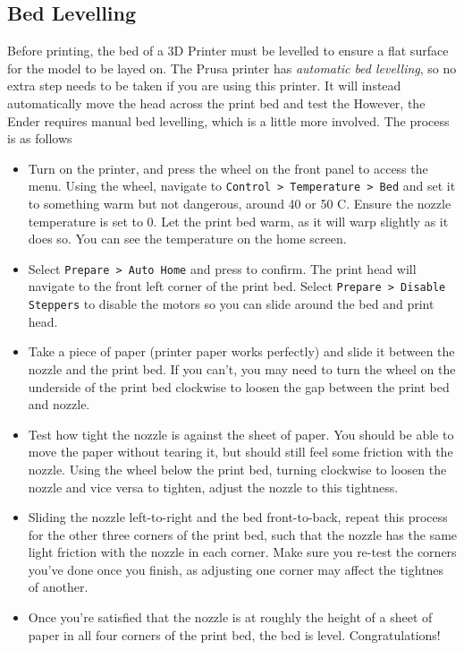 \documentclass[12pt]{report}
\begin{document}
\subsection*{Bed Levelling}
\label{sec:levelling}

Before printing, the bed of a 3D Printer must be levelled to ensure a flat
surface for the model to be layed on. The Prusa printer has \textit{automatic
bed levelling}, so no extra step needs to be taken if you are using this
printer. It will instead automatically move the head across the print bed and
test the However, the Ender requires manual bed levelling, which is a little
more involved. The process is as follows

\begin{itemize}
    \item Turn on the printer, and press the wheel on the front panel to access
        the menu. Using the wheel, navigate to \texttt{Control > Temperature >
        Bed} and set it to something warm but not dangerous, around 40 or 50
        \textdegree C. Ensure the nozzle temperature is set to 0. Let the
        print bed warm, as it will warp slightly as it does so. You can see the
        temperature on the home screen.
    \item Select \texttt{Prepare > Auto Home} and press to confirm. The print
        head will navigate to the front left corner of the print bed. Select
        \texttt{Prepare > Disable Steppers} to disable the motors so you can
        slide around the bed and print head.
    \item Take a piece of paper (printer paper works perfectly) and slide it
        between the nozzle and the print bed. If you can't, you may need to turn
        the wheel on the underside of the print bed clockwise to loosen the gap
        between the print bed and nozzle.
    \item Test how tight the nozzle is against the sheet of paper. You should be
        able to move the paper without tearing it, but should still feel some
        friction with the nozzle. Using the wheel below the print bed, turning
        clockwise to loosen the nozzle and vice versa to tighten, adjust the
        nozzle to this tightness.
    \item Sliding the nozzle left-to-right and the bed front-to-back, repeat
        this process for the other three corners of the print bed, such that
        the nozzle has the same light friction with the nozzle in each corner.
        Make sure you re-test the corners you've done once you finish, as
        adjusting one corner may affect the tightnes of another.
   \item Once you're satisfied that the nozzle is at roughly the height of a
        sheet of paper in all four corners of the print bed, the bed is level.
        Congratulations!
\end{itemize}
\end{document}
